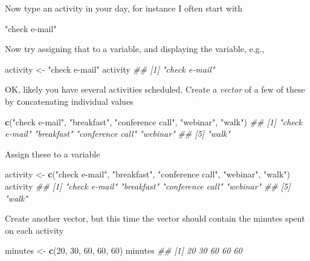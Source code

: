 \documentclass[]{book}
\newenvironment{Shaded}{\begin{snugshade}}{\end{snugshade}}
\newcommand{\CommentTok}[1]{\textcolor[rgb]{0.56,0.35,0.01}{\textit{#1}}}
\newcommand{\DecValTok}[1]{\textcolor[rgb]{0.00,0.00,0.81}{#1}}
\newcommand{\KeywordTok}[1]{\textcolor[rgb]{0.13,0.29,0.53}{\textbf{#1}}}
\newcommand{\NormalTok}[1]{#1}
\newcommand{\StringTok}[1]{\textcolor[rgb]{0.31,0.60,0.02}{#1}}
\begin{document}
Now type an activity in your day, for instance I often start with

\begin{Shaded}
\begin{Highlighting}[]
\StringTok{"check e-mail"}
\end{Highlighting}
\end{Shaded}

Now try assigning that to a variable, and displaying the variable, e.g.,

\begin{Shaded}
\begin{Highlighting}[]
\NormalTok{activity <-}\StringTok{ "check e-mail"}
\NormalTok{activity}
\CommentTok{## [1] "check e-mail"}
\end{Highlighting}
\end{Shaded}

OK, likely you have several activities scheduled. Create a \emph{vector} of a few of
these by \texttt{c}oncatenating individual values

\begin{Shaded}
\begin{Highlighting}[]
\KeywordTok{c}\NormalTok{(}\StringTok{"check e-mail"}\NormalTok{, }\StringTok{"breakfast"}\NormalTok{, }\StringTok{"conference call"}\NormalTok{, }\StringTok{"webinar"}\NormalTok{, }\StringTok{"walk"}\NormalTok{)}
\CommentTok{## [1] "check e-mail"    "breakfast"       "conference call" "webinar"        }
\CommentTok{## [5] "walk"}
\end{Highlighting}
\end{Shaded}

Assign these to a variable

\begin{Shaded}
\begin{Highlighting}[]
\NormalTok{activity <-}\StringTok{ }\KeywordTok{c}\NormalTok{(}\StringTok{"check e-mail"}\NormalTok{, }\StringTok{"breakfast"}\NormalTok{, }\StringTok{"conference call"}\NormalTok{, }\StringTok{"webinar"}\NormalTok{, }\StringTok{"walk"}\NormalTok{)}
\NormalTok{activity}
\CommentTok{## [1] "check e-mail"    "breakfast"       "conference call" "webinar"        }
\CommentTok{## [5] "walk"}
\end{Highlighting}
\end{Shaded}

Create another vector, but this time the vector should contain the minutes spent on each activity

\begin{Shaded}
\begin{Highlighting}[]
\NormalTok{minutes <-}\StringTok{ }\KeywordTok{c}\NormalTok{(}\DecValTok{20}\NormalTok{, }\DecValTok{30}\NormalTok{, }\DecValTok{60}\NormalTok{, }\DecValTok{60}\NormalTok{, }\DecValTok{60}\NormalTok{)}
\NormalTok{minutes}
\CommentTok{## [1] 20 30 60 60 60}
\end{Highlighting}
\end{Shaded}
\end{document}
